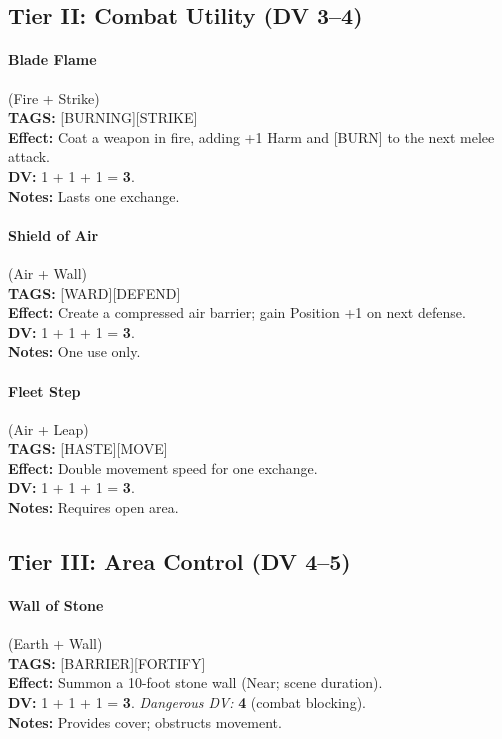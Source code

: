 \subsection{Tier II: Combat Utility (DV 3--4)}

\paragraph{Blade Flame} (Fire + Strike) \\
\textbf{TAGS:} {[BURNING][STRIKE]} \\
\textbf{Effect:} Coat a weapon in fire, adding +1 Harm and {[BURN]} to the next melee attack. \\
\textbf{DV:} 1 + 1 + 1 = \textbf{3}. \\
\textbf{Notes:} Lasts one exchange.

\paragraph{Shield of Air} (Air + Wall) \\
\textbf{TAGS:} {[WARD][DEFEND]} \\
\textbf{Effect:} Create a compressed air barrier; gain Position +1 on next defense. \\
\textbf{DV:} 1 + 1 + 1 = \textbf{3}. \\
\textbf{Notes:} One use only.

\paragraph{Fleet Step} (Air + Leap) \\
\textbf{TAGS:} {[HASTE][MOVE]} \\
\textbf{Effect:} Double movement speed for one exchange. \\
\textbf{DV:} 1 + 1 + 1 = \textbf{3}. \\
\textbf{Notes:} Requires open area.

\subsection{Tier III: Area Control (DV 4--5)}

\paragraph{Wall of Stone} (Earth + Wall) \\
\textbf{TAGS:} {[BARRIER][FORTIFY]} \\
\textbf{Effect:} Summon a 10-foot stone wall (Near; scene duration). \\
\textbf{DV:} 1 + 1 + 1 = \textbf{3}. \emph{Dangerous DV:} \textbf{4} (combat blocking). \\
\textbf{Notes:} Provides cover; obstructs movement.

